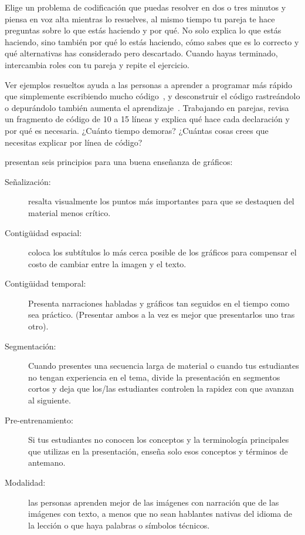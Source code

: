 Elige un problema de codificación que puedas resolver en dos o tres minutos
y piensa en voz alta mientras lo resuelves,
al mismo tiempo tu pareja te hace preguntas sobre lo que estás haciendo y por qué.
No solo explica lo que estás haciendo,
sino también por qué lo estás haciendo,
cómo sabes que es lo correcto y qué alternativas has considerado pero descartado.
Cuando hayas terminado,
intercambia roles con tu pareja y repite el ejercicio.



Ver ejemplos resueltos ayuda a las personas a aprender a programar más rápido que simplemente escribiendo mucho código~\cite{Skud2014},
y desconstruir el código rastreándolo o depurándolo también aumenta el aprendizaje~\cite{Grif2016}.
Trabajando en parejas, revisa un fragmento de código de 10 a 15 líneas
y explica qué hace cada declaración y por qué es necesaria.
¿Cuánto tiempo demoras?
¿Cuántas cosas crees que necesitas explicar por línea de código?


\cite{Maye2009,Mill2016a} presentan seis principios para una buena enseñanza de gráficos:

\begin{description}

\item[Señalización:]
  resalta visualmente los puntos más importantes
  para que se destaquen del material menos crítico.

\item[Contigüidad espacial:]
  coloca los subtítulos lo más cerca posible de los gráficos para compensar el costo de cambiar entre la imagen y el texto.

\item[Contigüidad temporal:]
  Presenta narraciones habladas y gráficos tan seguidos en el tiempo como sea práctico.
  (Presentar ambos a la vez es mejor que presentarlos uno tras otro).

\item[Segmentación:]
  Cuando presentes una secuencia larga de material o
  cuando tus estudiantes no tengan experiencia en el tema,
  divide la presentación en segmentos cortos y deja que los/las estudiantes controlen la rapidez con que avanzan al siguiente.

\item[Pre-entrenamiento:]
  Si tus estudiantes no conocen los conceptos y la terminología principales que utilizas en la presentación,
  enseña solo esos conceptos y términos de antemano.

\item[Modalidad:]
las personas aprenden mejor de las imágenes con narración que de las imágenes con texto,
a menos que no sean hablantes nativas del idioma de la lección o que haya palabras o símbolos técnicos.

\end{description}

